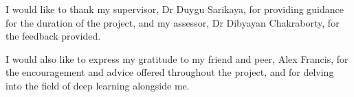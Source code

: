 I would like to thank my supervisor, Dr Duygu Sarikaya, for providing guidance for the duration of the project, and my assessor, Dr Dibyayan Chakraborty, for the feedback provided.

I would also like to express my gratitude to my friend and peer, Alex Francis, for the encouragement and advice offered throughout the project, and for delving into the field of deep learning alongside me.
\vspace{1cm}

